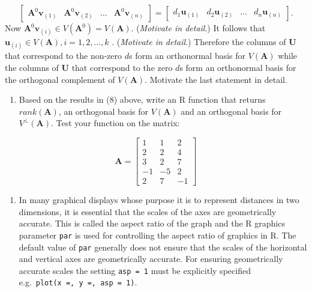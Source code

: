 \documentclass[
]{book}
\providecommand{\tightlist}{%
  \setlength{\itemsep}{0pt}\setlength{\parskip}{0pt}}
\begin{document}
\[
\begin{bmatrix} 
\mathbf{A}^0 \mathbf{v}_{(1)} & \mathbf{A}^0 \mathbf{v}_{(2)} & \dots & \mathbf{A}^0 \mathbf{v}_{(n)}
\end{bmatrix} = \begin{bmatrix} 
d_1 \mathbf{u}_{(1)} & d_2 \mathbf{u}_{(2)} & \dots & d_n \mathbf{u}_{(n)}
\end{bmatrix}.
\]
Now \(\mathbf{A}^0 \mathbf{v}_{(i)} \in V(\mathbf{A}^0) = V(\mathbf{A})\). (\emph{Motivate in detail}.) It follows that \(\mathbf{u}_{(i)} \in V(\mathbf{A}), i = 1, 2, \dots, k\) . (\emph{Motivate in detail}.) Therefore the columns of \(\mathbf{U}\) that correspond to the non-zero \(d\)s form an orthonormal basis for \(V(\mathbf{A})\) while the columns of \(\mathbf{U}\) that correspond to the zero \(d\)s form an orthonormal basis for the orthogonal complement of \(V(\mathbf{A})\). Motivate the last statement in detail.

\begin{enumerate}
\def\labelenumi{\arabic{enumi}.}
\setcounter{enumi}{8}
\tightlist
\item
  Based on the results in (8) above, write an R function that returns \(rank(\mathbf{A})\), an orthogonal basis for \(V(\mathbf{A})\) and an orthogonal basis for \(V^⊥(\mathbf{A})\). Test your function on the matrix:
\end{enumerate}

\[
\mathbf{A} = \begin{bmatrix} 
                    1 & 1 & 2 \\
                    2 & 2 & 4 \\
                    3 & 2 & 7 \\
                    -1 & -5 & 2 \\
                    2 & 7 & -1
              \end{bmatrix} 
\]

\begin{enumerate}
\def\labelenumi{\arabic{enumi}.}
\setcounter{enumi}{9}
\tightlist
\item
  In many graphical displays whose purpose it is to represent distances in two dimensions, it is essential that the scales of the axes are geometrically accurate. This is called the aspect ratio of the graph and the R graphics parameter \texttt{par} is used for controlling the aspect ratio of graphics in R. The default value of \texttt{par} generally does not ensure that the scales of the horizontal and vertical axes are geometrically accurate. For ensuring geometrically accurate scales the setting \texttt{asp\ =\ 1} must be explicitly specified e.g.~\texttt{plot(x\ =,\ y\ =,\ asp\ =\ 1)}.
\end{enumerate}
\end{document}

